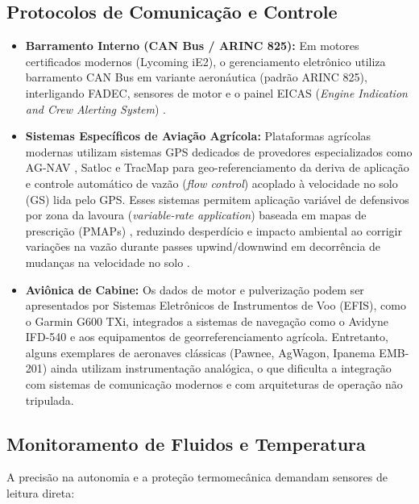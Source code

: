 \documentclass[a4paper,12pt]{article}
\begin{document}
\subsection{Protocolos de Comunicação e Controle}
\begin{itemize}
    \item \textbf{Barramento Interno (CAN Bus / ARINC 825):} Em motores certificados modernos (Lycoming iE2), o gerenciamento eletrônico utiliza barramento CAN Bus em variante aeronáutica (padrão ARINC 825), interligando FADEC, sensores de motor e o painel EICAS (\textit{Engine Indication and Crew Alerting System}) \cite{lycomingmanual, lycoming_io720}.
    
    \item \textbf{Sistemas Específicos de Aviação Agrícola:} Plataformas agrícolas modernas utilizam sistemas GPS dedicados de provedores especializados como AG-NAV \cite{agnav_official}, Satloc \cite{satloc_intelliflow} e TracMap \cite{tracmap_aviation} para geo-referenciamento da deriva de aplicação e controle automático de vazão (\textit{flow control}) acoplado à velocidade no solo (GS) lida pelo GPS. Esses sistemas permitem aplicação variável de defensivos por zona da lavoura (\textit{variable-rate application}) baseada em mapas de prescrição (PMAPs) \cite{satloc_intelliflow, kirk_1996_satloc}, reduzindo desperdício e impacto ambiental ao corrigir variações na vazão durante passes upwind/downwind em decorrência de mudanças na velocidade no solo \cite{kirk_1996_satloc}.
    
    \item \textbf{Aviônica de Cabine:} Os dados de motor e pulverização podem ser apresentados por Sistemas Eletrônicos de Instrumentos de Voo (EFIS), como o Garmin G600 TXi, integrados a sistemas de navegação como o Avidyne IFD-540 e aos equipamentos de georreferenciamento agrícola. Entretanto, alguns exemplares de aeronaves clássicas (Pawnee, AgWagon, Ipanema EMB-201) ainda utilizam instrumentação analógica, o que dificulta a integração com sistemas de comunicação modernos e com arquiteturas de operação não tripulada.
\end{itemize}

\subsection{Monitoramento de Fluidos e Temperatura}
A precisão na autonomia e a proteção termomecânica demandam sensores de leitura direta:
\end{document}
